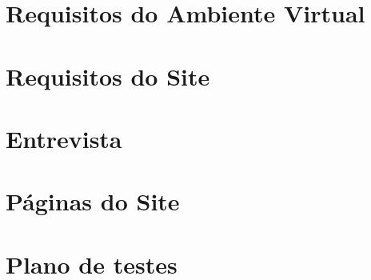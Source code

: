\chapter{Requisitos do Ambiente Virtual}\label{apendice}


\chapter{Requisitos do Site} \label{Apendice B}


\chapter{Entrevista}\label{ap:entrevista}


% 

\chapter{Páginas do Site}\label{apendice paginas site}
\label{ap:páginas_do_site}

\chapter{Plano de testes}\label{ap:plano de testes}
